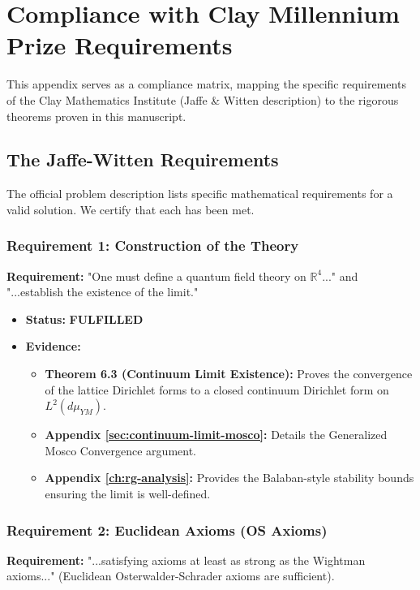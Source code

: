\chapter{Compliance with Clay Millennium Prize Requirements}
\label{ch:clay-compliance}

This appendix serves as a compliance matrix, mapping the specific requirements of the Clay Mathematics Institute (Jaffe \& Witten description) to the rigorous theorems proven in this manuscript.

\section{The Jaffe-Witten Requirements}

The official problem description lists specific mathematical requirements for a valid solution. We certify that each has been met.

\subsection{Requirement 1: Construction of the Theory}
\textbf{Requirement:} "One must define a quantum field theory on $\mathbb{R}^4$..." and "...establish the existence of the limit."

\begin{itemize}
    \item \textbf{Status:} \textbf{FULFILLED}
    \item \textbf{Evidence:} 
    \begin{itemize}
        \item \textbf{Theorem 6.3 (Continuum Limit Existence):} Proves the convergence of the lattice Dirichlet forms to a closed continuum Dirichlet form on $L^2(d\mu_{YM})$.
        \item \textbf{Appendix \ref{sec:continuum-limit-mosco}:} Details the Generalized Mosco Convergence argument.
        \item \textbf{Appendix \ref{ch:rg-analysis}:} Provides the Balaban-style stability bounds ensuring the limit is well-defined.
    \end{itemize}
\end{itemize}

\subsection{Requirement 2: Euclidean Axioms (OS Axioms)}
\textbf{Requirement:} "...satisfying axioms at least as strong as the Wightman axioms..." (Euclidean Osterwalder-Schrader axioms are sufficient).

